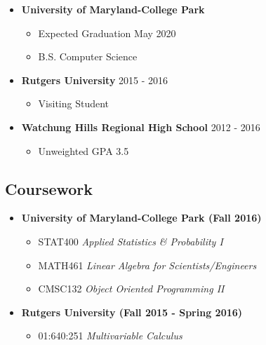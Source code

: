 \documentclass[11pt,letterpaper]{moderncv}
\begin{document}
\begin{itemize}

	\item[]{\textbf{University of Maryland-College Park}}
	\vspace{-8pt}
	\begin{itemize}
		\item[]{{Expected Graduation} \hfill May 2020}
		\vspace{-6pt}
		\item[]{{B.S.} \hfill Computer Science}
		\vspace{0pt}
	\end{itemize}
	\vspace{-10pt}
	\item[]{\textbf{Rutgers University} \hfill 2015 - 2016}
	\vspace{-8pt}
	\begin{itemize}
		\item[]{Visiting Student}
	\end{itemize}
	\vspace{-10pt}
	\item[]{\textbf{Watchung Hills Regional High School} \hfill 2012 - 2016}
	\vspace{-8pt}
	\begin{itemize}
		\item[]{{Unweighted GPA} \hfill {3.5}}
		\vspace{0pt}
	\end{itemize}
\end{itemize}

\vspace{-12pt}
\subsection{Coursework}
\begin{itemize}
	\item[]{\textbf{University of Maryland-College Park (Fall 2016)}}
		\vspace{-8pt}
		\begin{itemize}
			\item[]{{STAT400} \hfill \textit{Applied Statistics \& Probability I}}
			\vspace{-6pt}
			\item[]{{MATH461} \hfill \textit{Linear Algebra for Scientists/Engineers}}
			\vspace{-6pt}
			\item[]{{CMSC132} \hfill \textit{Object Oriented Programming II}}
			\vspace{0pt}
		\end{itemize}
		\vspace{-10pt}
		\item[]{\textbf{Rutgers University (Fall 2015 - Spring 2016)}}
		\vspace{-8pt}
		\begin{itemize}
			\item[]{01:640:251 \hfill \textit{Multivariable Calculus}}
			\vspace{0pt}
		\end{itemize}
\end{itemize}
\vspace{-12pt}
\end{document}
